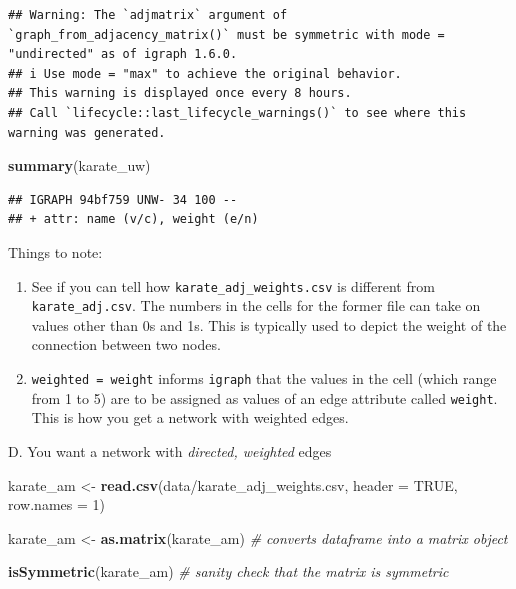 \documentclass[
]{book}
\newenvironment{Shaded}{\begin{snugshade}}{\end{snugshade}}
\newcommand{\AttributeTok}[1]{\textcolor[rgb]{0.13,0.29,0.53}{#1}}
\newcommand{\CommentTok}[1]{\textcolor[rgb]{0.56,0.35,0.01}{\textit{#1}}}
\newcommand{\ConstantTok}[1]{\textcolor[rgb]{0.56,0.35,0.01}{#1}}
\newcommand{\DecValTok}[1]{\textcolor[rgb]{0.00,0.00,0.81}{#1}}
\newcommand{\FunctionTok}[1]{\textcolor[rgb]{0.13,0.29,0.53}{\textbf{#1}}}
\newcommand{\NormalTok}[1]{#1}
\newcommand{\OtherTok}[1]{\textcolor[rgb]{0.56,0.35,0.01}{#1}}
\newcommand{\StringTok}[1]{\textcolor[rgb]{0.31,0.60,0.02}{#1}}
\providecommand{\tightlist}{%
  \setlength{\itemsep}{0pt}\setlength{\parskip}{0pt}}
\begin{document}
\begin{verbatim}
## Warning: The `adjmatrix` argument of `graph_from_adjacency_matrix()` must be symmetric with mode = "undirected" as of igraph 1.6.0.
## i Use mode = "max" to achieve the original behavior.
## This warning is displayed once every 8 hours.
## Call `lifecycle::last_lifecycle_warnings()` to see where this warning was generated.
\end{verbatim}

\begin{Shaded}
\begin{Highlighting}[]
\FunctionTok{summary}\NormalTok{(karate\_uw)}
\end{Highlighting}
\end{Shaded}

\begin{verbatim}
## IGRAPH 94bf759 UNW- 34 100 -- 
## + attr: name (v/c), weight (e/n)
\end{verbatim}

Things to note:

\begin{enumerate}
\def\labelenumi{\arabic{enumi}.}
\tightlist
\item
  See if you can tell how \texttt{karate\_adj\_weights.csv} is different from \texttt{karate\_adj.csv}. The numbers in the cells for the former file can take on values other than 0s and 1s. This is typically used to depict the weight of the connection between two nodes.
\item
  \texttt{weighted\ =\ \textquotesingle{}weight\textquotesingle{}} informs \texttt{igraph} that the values in the cell (which range from 1 to 5) are to be assigned as values of an edge attribute called \texttt{\textquotesingle{}weight\textquotesingle{}}. This is how you get a network with weighted edges.
\end{enumerate}

D. You want a network with \emph{directed, weighted} edges

\begin{Shaded}
\begin{Highlighting}[]
\NormalTok{karate\_am }\OtherTok{\textless{}{-}} \FunctionTok{read.csv}\NormalTok{(}\StringTok{\textquotesingle{}data/karate\_adj\_weights.csv\textquotesingle{}}\NormalTok{, }\AttributeTok{header =} \ConstantTok{TRUE}\NormalTok{, }\AttributeTok{row.names =} \DecValTok{1}\NormalTok{)}

\NormalTok{karate\_am }\OtherTok{\textless{}{-}} \FunctionTok{as.matrix}\NormalTok{(karate\_am) }\CommentTok{\# converts dataframe into a matrix object}

\FunctionTok{isSymmetric}\NormalTok{(karate\_am) }\CommentTok{\# sanity check that the matrix is symmetric }
\end{Highlighting}
\end{Shaded}
\end{document}
